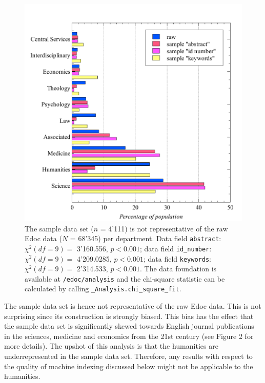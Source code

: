 \begin{figure}
\centering
\includegraphics{images/chi_square_selection_fields.pdf}
\caption{The sample data set (\(n\) = 4'111) is not representative of
the raw Edoc data (\(N\) = 68'345) per department. Data field
\texttt{abstract}: \(\chi^2 (df=9) =\) 3'160.556, \(p < 0.001\); data
field \texttt{id\_number}: \(\chi^2 (df=9) =\) 4'209.0285,
\(p < 0.001\); data field \texttt{keywords}: \(\chi^2 (df=9) =\)
2'314.533, \(p < 0.001\). The data foundation is available at
\texttt{/edoc/analysis} and the chi-square statistic can be calculated
by calling \texttt{\_Analysis.chi\_square\_fit}.}
\end{figure}

The sample data set is hence not representative of the raw Edoc data.
This is not surprising since its construction is strongly biased. This
bias has the effect that the sample data set is significantly skewed
towards English journal publications in the sciences, medicine and
economics from the 21st century (see Figure 2 for more details). The
upshot of this analysis is that the humanities are underrepresented in
the sample data set. Therefore, any results with respect to the quality
of machine indexing discussed below might not be applicable to the
humanities.

